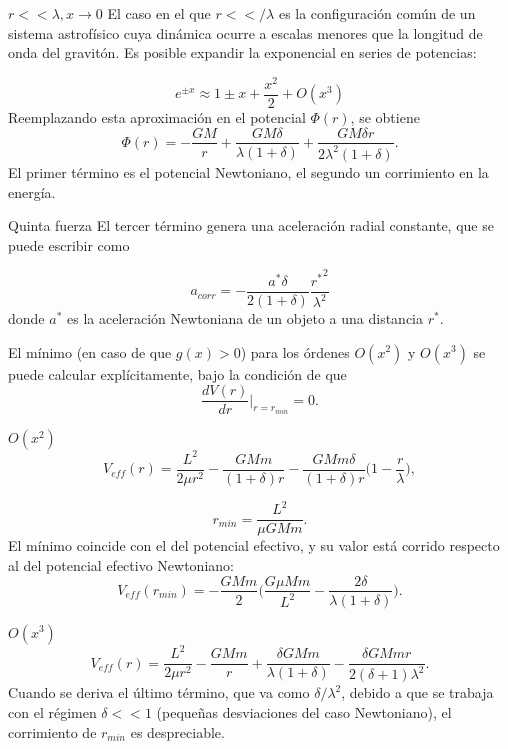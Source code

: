\documentclass{beamer}
\begin{document}
	\begin{frame}[allowframebreaks]{$r<<\lambda, x\rightarrow 0$}
	El caso en el que $r<</\lambda$ es la configuración común de un sistema astrofísico cuya dinámica ocurre a escalas menores que la longitud de onda del gravitón. Es posible expandir la exponencial en series de potencias:
	
	\begin{equation}
		e^{\pm x}\approx 1\pm x +\frac{x^2}{2}+O(x^3)
	\end{equation}
	Reemplazando esta aproximación en el potencial $\Phi(r)$, se obtiene
	\begin{equation}
		\Phi(r)=-\frac{GM}{r}+\frac{GM\delta}{\lambda(1+\delta)}+\frac{GM\delta r}{2\lambda^2(1+\delta)}.
	\end{equation}
	El primer término es el potencial Newtoniano, el segundo un corrimiento en la energía.
	\begin{block}{Quinta fuerza}
		El tercer término genera una aceleración radial constante, que se puede escribir como
		
		$$a_{corr}=-\frac{a^*\delta}{2(1+\delta)}\frac{{r^*}^2}{\lambda^2}$$
		donde $a^*$ es la aceleración Newtoniana de un objeto a una distancia $r^*$.
	\end{block}
	El mínimo (en caso de que $g(x)>0$) para los órdenes $O(x^2)$ y $O(x^3)$ se puede calcular explícitamente, bajo la condición de que
	$$\frac{dV(r)}{dr}\Bigg|_{r=r_{min}}=0.$$
	
	\begin{block}{$O(x^2)$}
	\begin{equation}
		V_{eff}(r)=\frac{L^2}{2\mu r^2}-\frac{GMm}{(1+\delta)r}-\frac{GMm\delta}{(1+\delta)r}\Big( 1-\frac{r}{\lambda}\Big),
	\end{equation}
	
	\begin{equation}
	r_{min}=\frac{L^2}{\mu GMm}.
	\end{equation}
	El mínimo coincide con el del potencial efectivo, y su valor está corrido respecto al del potencial efectivo Newtoniano:
	\begin{equation}
		V_{eff}(r_{min})=-\frac{GMm}{2}\Bigg(\frac{G\mu Mm}{L^2}-\frac{2\delta}{\lambda(1+\delta)}\Bigg).
	\end{equation}
	\end{block}
	
	\begin{block}{$O(x^3)$}
	\begin{equation}
	V_{eff}(r)=\frac{L^2}{2\mu r^2}-\frac{GMm}{r}+\frac{\delta GMm}{\lambda(1+\delta)}-\frac{\delta GMmr}{2(\delta+1)\lambda^2}.
	\end{equation}
	Cuando se deriva el último término, que va como $\delta/\lambda^2$, debido a que se trabaja con el régimen  $\delta<<1$ (pequeñas desviaciones del caso Newtoniano), el corrimiento de $r_{min}$ es despreciable.
	

\end{block}
\end{frame}
\end{document}
